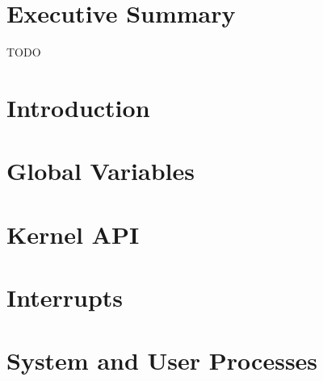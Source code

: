 \documentclass[se]{uw-wkrpt}
\begin{document}
\frontmatter

\section{Executive Summary}
TODO

\tableofcontents
\listoffigures
\listoftables

\mainmatter

\section{Introduction}\label{sec:intro}

\section{Global Variables}\label{sec:global}

\section{Kernel API}\label{sec:kernel}

\section{Interrupts}\label{sec:interupt}

\section{System and User Processes}\label{sec:proc}
\end{document}
